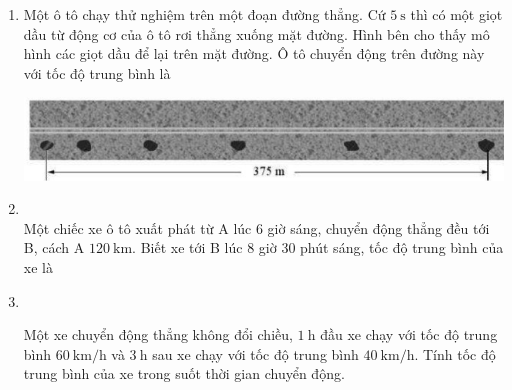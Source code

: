 \begin{enumerate}[label=\bfseries Câu \arabic*:,leftmargin=1.5cm]
\item Một ô tô chạy thử nghiệm trên một đoạn đường thẳng. Cứ $\SI{5}{\second}$ thì có một giọt dầu từ động cơ của ô tô rơi thẳng xuống mặt đường. Hình bên cho thấy mô hình các giọt dầu để lại trên mặt đường. Ô tô chuyển động trên đường này với tốc độ trung bình là
\begin{center}
	\includegraphics[width=0.5\linewidth]{../figs/VN10-2022-PH-TP004-1-P-1}
\end{center}
	
	\item {}\\
	Một chiếc xe ô tô xuất phát từ A lúc 6 giờ sáng, chuyển động thẳng đều tới B, cách A $\SI{120}{\kilo\meter}$. Biết xe tới B lúc 8 giờ 30 phút sáng, tốc độ trung bình của xe là 
	\begin{mcq}(4)
		\item $\SI{48}{\kilo\meter/\hour}$.
		\item $\SI{45}{\kilo\meter/\hour}$.
		\item $\SI{60}{\kilo\meter/\hour}$.
		\item $\SI{50}{\kilo\meter/\second}$.
	\end{mcq}

	\item {}\\
	{Một xe chuyển động thẳng không đổi chiều, $\SI{1}{\hour}$ đầu xe chạy với tốc độ trung bình $\SI{60}{\kilo\meter/\hour}$ và $\SI{3}{\hour}$ sau xe chạy với tốc độ trung bình $\SI{40}{\kilo\meter/\hour}$. Tính tốc độ trung bình của xe trong suốt thời gian chuyển động.
	}
	

\end{enumerate}
